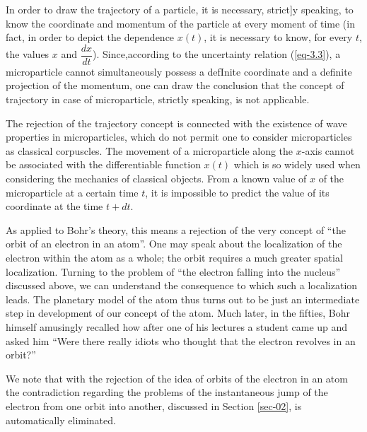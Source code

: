 \documentclass[a4paper,sfsidenotes,colorlinks=true]{tufte-book}
\numberwithin{equation}{section}
\numberwithin{figure}{section}
\begin{document}
In order to draw
the trajectory of a particle, it is necessary, strict]y speaking, to
know the coordinate and momentum of the particle at every moment of
time (in fact, in order to depict the dependence $x (t)$, it is
necessary to know, for every $t$, the values $x$ and
$\dfrac{dx}{dt}$). Since,according to the uncertainty relation
(\ref{eq-3.3}), a microparticle cannot simultaneously possess a
defInite coordinate and a definite projection of the momentum, one can
draw the conclusion that the concept of trajectory in case of
microparticle, strictly speaking, is not applicable.

  The rejection of the trajectory concept is connected with the
  existence of wave properties in microparticles, which do not permit
  one to consider microparticles as classical corpuscles. The movement
  of a microparticle along the $x$-axis cannot be associated with the
  differentiable function $x (t)$ which is so widely used when
  considering the mechanics of classical objects. From a known value
  of $x$ of the microparticle at a certain time $t$, it is impossible to
  predict the value of its coordinate at the time $t + dt$.

  As applied to Bohr's theory, this means a rejection of the very
  concept of ``the orbit of an electron in an atom''. One may speak
  about the localization of the electron within the atom as a whole;
  the orbit requires a much greater spatial localization. Turning to
  the problem of ``the electron falling into the nucleus'' discussed
  above, we can understand the consequence to which such a
  localization leads. The planetary model of the atom thus turns out
  to be just an intermediate step in development of our concept of the
  atom. Much later, in the fifties, Bohr himself amusingly recalled
  how after one of his lectures a student came up and asked him ``Were
  there really idiots who thought that the electron revolves in an
  orbit?''

\begin{fullwidth}
  \setlength{\leftskip}{3cm} \textsf{\small We note that with the
    rejection of the idea of orbits of the electron in an atom the
    contradiction regarding the problems of the instantaneous jump of
    the electron from one orbit into another, discussed in Section
    \ref{sec-02}, is automatically eliminated.}
\end{fullwidth}
\vspace{5pt}
\setlength{\leftskip}{0pt}
\end{document}
